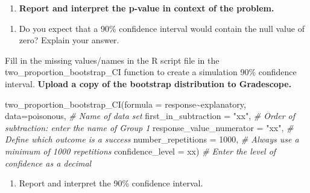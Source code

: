 \documentclass[
]{report}
\newenvironment{Shaded}{\begin{snugshade}}{\end{snugshade}}
\newcommand{\AttributeTok}[1]{\textcolor[rgb]{0.77,0.63,0.00}{#1}}
\newcommand{\CommentTok}[1]{\textcolor[rgb]{0.56,0.35,0.01}{\textit{#1}}}
\newcommand{\DecValTok}[1]{\textcolor[rgb]{0.00,0.00,0.81}{#1}}
\newcommand{\FunctionTok}[1]{\textcolor[rgb]{0.00,0.00,0.00}{#1}}
\newcommand{\NormalTok}[1]{#1}
\newcommand{\SpecialCharTok}[1]{\textcolor[rgb]{0.00,0.00,0.00}{#1}}
\newcommand{\StringTok}[1]{\textcolor[rgb]{0.31,0.60,0.02}{#1}}
\providecommand{\tightlist}{%
  \setlength{\itemsep}{0pt}\setlength{\parskip}{0pt}}
\begin{document}
\begin{enumerate}
\def\labelenumi{\arabic{enumi}.}
\setcounter{enumi}{7}
\tightlist
\item
  \textbf{Report and interpret the p-value in context of the problem.}
\end{enumerate}

\vspace{0.8in}

\begin{enumerate}
\def\labelenumi{\arabic{enumi}.}
\setcounter{enumi}{8}
\tightlist
\item
  Do you expect that a 90\% confidence interval would contain the null value of zero? Explain your answer.
\end{enumerate}

\vspace{0.8in}

Fill in the missing values/names in the R script file in the two\_proportion\_bootstrap\_CI function to create a simulation 90\% confidence interval. \textbf{Upload a copy of the bootstrap distribution to Gradescope.}

\begin{Shaded}
\begin{Highlighting}[]
\FunctionTok{two\_proportion\_bootstrap\_CI}\NormalTok{(}\AttributeTok{formula =}\NormalTok{ response}\SpecialCharTok{\textasciitilde{}}\NormalTok{explanatory, }
         \AttributeTok{data=}\NormalTok{poisonous, }\CommentTok{\# Name of data set}
         \AttributeTok{first\_in\_subtraction =} \StringTok{"xx"}\NormalTok{, }\CommentTok{\# Order of subtraction: enter the name of Group 1}
         \AttributeTok{response\_value\_numerator =} \StringTok{"xx"}\NormalTok{, }\CommentTok{\# Define which outcome is a success }
         \AttributeTok{number\_repetitions =} \DecValTok{1000}\NormalTok{, }\CommentTok{\# Always use a minimum of 1000 repetitions}
         \AttributeTok{confidence\_level =}\NormalTok{ xx) }\CommentTok{\# Enter the level of confidence as a decimal}
\end{Highlighting}
\end{Shaded}

\begin{enumerate}
\def\labelenumi{\arabic{enumi}.}
\setcounter{enumi}{9}
\tightlist
\item
  Report and interpret the 90\% confidence interval.
\end{enumerate}

\vspace{0.8in}
\end{document}
